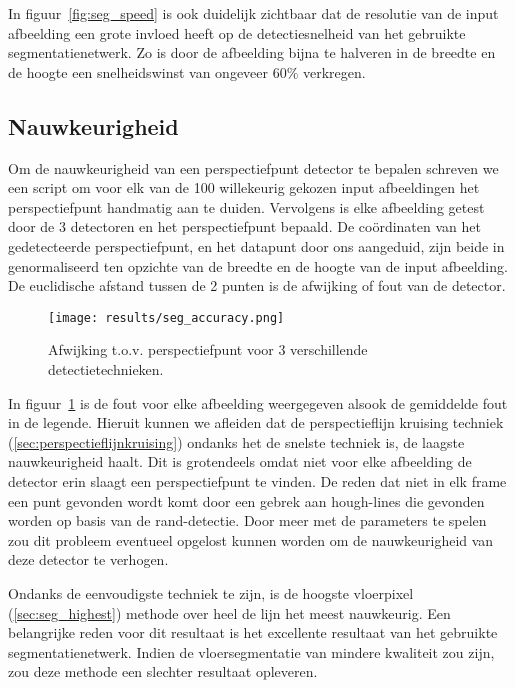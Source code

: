In figuur~\ref{fig:seg_speed} is ook duidelijk zichtbaar dat de resolutie van de input afbeelding een grote invloed heeft op de detectiesnelheid
van het gebruikte segmentatienetwerk.
Zo is door de afbeelding bijna te halveren in de breedte en de hoogte een snelheidswinst van ongeveer $60\%$ verkregen.


\subsection{Nauwkeurigheid}
Om de nauwkeurigheid van een perspectiefpunt detector te bepalen schreven we een script om voor elk van de 100 willekeurig gekozen input afbeeldingen
het perspectiefpunt handmatig aan te duiden.
Vervolgens is elke afbeelding getest door de 3 detectoren en het perspectiefpunt bepaald.
De co\"{o}rdinaten van het gedetecteerde perspectiefpunt, en het datapunt door ons aangeduid, zijn beide in genormaliseerd ten opzichte van de breedte en de hoogte van de input afbeelding.
De euclidische afstand tussen de 2 punten is de afwijking of fout van de detector.

\begin{figure}[h]
    \centering
    \texttt{[image: results/seg\_accuracy.png]}
    \caption{Afwijking t.o.v. perspectiefpunt voor 3 verschillende detectietechnieken.}
    \label{fig:seg_accuracy}
\end{figure}

In figuur~\ref{fig:seg_accuracy} is de fout voor elke afbeelding weergegeven alsook de gemiddelde fout in de legende.
Hieruit kunnen we afleiden dat de perspectieflijn kruising techniek (\ref{sec:perspectieflijnkruising}) ondanks het de snelste techniek is, de laagste nauwkeurigheid haalt.
Dit is grotendeels omdat niet voor elke afbeelding de detector erin slaagt een perspectiefpunt te vinden. De reden dat niet in elk frame
een punt gevonden wordt komt door een gebrek aan hough-lines die gevonden worden op basis van de rand-detectie.
Door meer met de parameters te spelen zou dit probleem eventueel opgelost kunnen worden om de nauwkeurigheid van deze detector te verhogen.

Ondanks de eenvoudigste techniek te zijn, is de hoogste vloerpixel (\ref{sec:seg_highest}) methode over heel de lijn het meest nauwkeurig.
Een belangrijke reden voor dit resultaat is het excellente resultaat van het gebruikte segmentatienetwerk.
Indien de vloersegmentatie van mindere kwaliteit zou zijn, zou deze methode een slechter resultaat opleveren.

